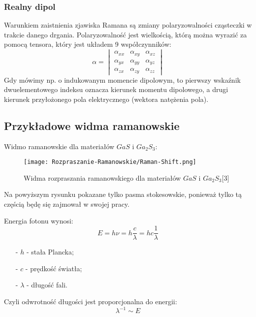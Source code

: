 \subsubsection{Realny dipol}
Warunkiem zaistnienia zjawiska Ramana są zmiany polaryzowalności cząsteczki w trakcie danego drgania. Polaryzowalność jest wielkością, którą można wyrazić za pomocą tensora, który jest układem 9 współczynników:
\begin{equation}
	\alpha = 
	\begin{vmatrix}
	\alpha_{xx} & \alpha_{xy} & \alpha_{xz} \\
	\alpha_{yx} & \alpha_{yy} & \alpha_{yz} \\
	\alpha_{zx} & \alpha_{zy} & \alpha_{zz}
	\end{vmatrix}
\end{equation}
Gdy mówimy np. o indukowanym momencie dipolowym, to pierwszy wskaźnik dwuelementowego indeksu oznacza kierunek momentu dipolowego, a drugi kierunek przyłożonego pola elektrycznego (wektora natężenia pola).

\newpage
\subsection{Przykładowe widma ramanowskie}
Widmo ramanowskie dla materiałów $GaS$ i $Ga_{2}S_{3}$:
\begin{figure}[H]
	\begin{center}
		\texttt{[image: Rozpraszanie-Ramanowskie/Raman-Shift.png]}
		\caption{Widma rozpraszania ramanowskiego dla materiałów $GaS$ i $Ga_{2}S_{3}$[3]}
	\end{center}
\end{figure}
Na powyższym rysunku pokazane tylko pasma stokesowskie, ponieważ tylko tą częścią będę się zajmował w swojej pracy.

Energia fotonu wynosi:
\begin{equation}
	E = h \nu = h \frac{c}{\lambda} = hc \frac{1}{\lambda} 
\end{equation}
\begin{itemize}
	\item[-]{$h$ - stała Plancka};
	\item[-]{$c$ - prędkość światła};
	\item[-]{$\lambda$ - długość fali}.
\end{itemize}
Czyli odwrotność długości jest proporcjonalna do energii:
\begin{equation}
	\lambda^{-1} \sim E
\end{equation}

